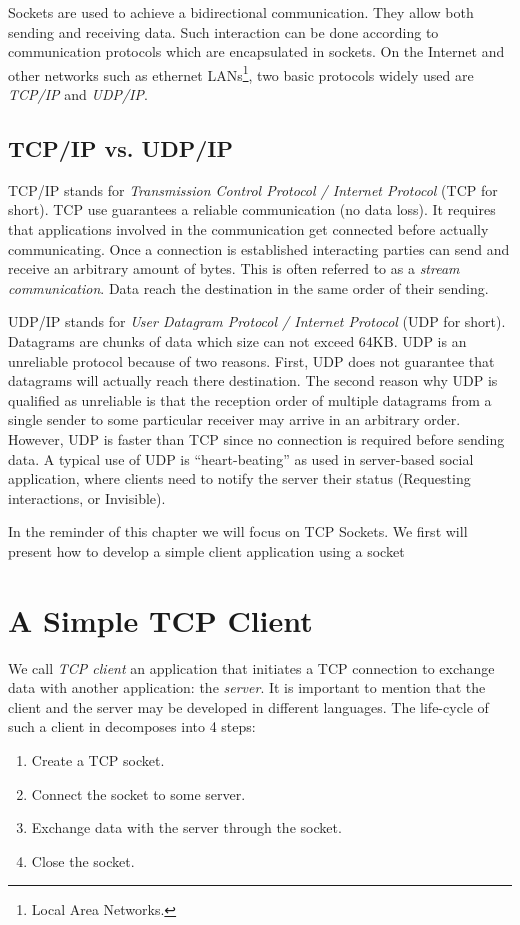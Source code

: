 \documentclass[a4paper,10pt,twoside]{book}
\begin{document}
Sockets are used to achieve a bidirectional communication. They allow both sending and receiving data. Such interaction can be done according to communication protocols which are encapsulated in sockets. On the Internet and other networks such as ethernet LANs\footnote{Local Area Networks.}, two basic protocols widely used are \textit{TCP/IP} and \textit{UDP/IP}.

\subsection{TCP/IP vs. UDP/IP}
TCP/IP stands for \textit{Transmission Control Protocol / Internet Protocol} (TCP for short).
TCP use guarantees a reliable communication (no data loss). It requires that applications involved in the communication get connected before actually communicating. 
Once a connection is established interacting parties can send and receive an arbitrary amount of bytes. This is often referred to as a \textit{stream communication}.
Data reach the destination in the same order of their sending.

UDP/IP stands for \textit{User Datagram Protocol / Internet Protocol} (UDP for short).
Datagrams are chunks of data which size can not exceed 64KB.
UDP is an unreliable protocol because of two reasons.
First, UDP does not guarantee that  datagrams will actually reach there destination.
The second reason why UDP is qualified as unreliable is that the reception order of multiple datagrams from a single sender to some particular receiver may arrive in an arbitrary order.
However, UDP is faster than TCP since no connection is required before sending data.
A typical use of UDP is  ``heart-beating'' as used in server-based social application, where clients need to notify the server their status (\eg Requesting interactions, or Invisible).

In the reminder of this chapter we will focus on TCP Sockets.
We first will present how to develop a simple client application using a socket
 
\section{A Simple TCP Client}
We call \textit{TCP client}  an application that initiates a TCP connection to exchange data with another application: the \textit{server}.
It is important to mention that the client and the server may be developed in different languages.
The life-cycle of such a client in \pharo decomposes into 4 steps:
\begin{enumerate}
\item Create a TCP socket.
\item Connect the socket to some server.
\item Exchange data with the server through the socket.
\item Close the socket.
\end{enumerate}
\end{document}
